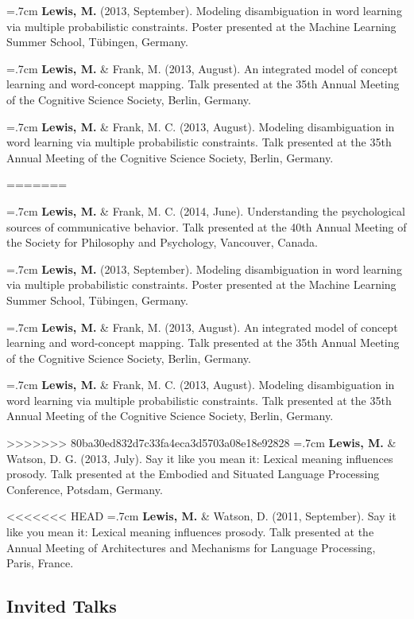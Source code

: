 \documentclass[letterpaper]{article}
\begin{document}
 \hangindent=.7cm {\bf Lewis, M.} (2013, September). Modeling disambiguation in word learning via multiple probabilistic constraints. Poster presented at the Machine Learning Summer School, T\"{u}bingen, Germany.
 

 \hangindent=.7cm {\bf Lewis, M.}  \& Frank, M. (2013, August). An integrated model of concept learning and word-concept mapping. Talk presented at the 35th Annual Meeting of the Cognitive Science Society, Berlin, Germany.
 
 \hangindent=.7cm {\bf Lewis, M.}  \& Frank, M. C.  (2013, August). Modeling disambiguation in word learning via multiple probabilistic constraints. Talk presented at the 35th Annual Meeting of the Cognitive Science Society, Berlin, Germany.
 
=======

\hangindent=.7cm {\bf Lewis, M.} \& Frank, M. C. (2014, June). Understanding the psychological sources of communicative behavior. Talk presented at the 40th Annual Meeting of the Society for Philosophy and Psychology, Vancouver, Canada.

 \hangindent=.7cm {\bf Lewis, M.} (2013, September). Modeling disambiguation in word learning via multiple probabilistic constraints. Poster presented at the Machine Learning Summer School, T\"{u}bingen, Germany.


 \hangindent=.7cm {\bf Lewis, M.}  \& Frank, M. (2013, August). An integrated model of concept learning and word-concept mapping. Talk presented at the 35th Annual Meeting of the Cognitive Science Society, Berlin, Germany.

 \hangindent=.7cm {\bf Lewis, M.}  \& Frank, M. C.  (2013, August). Modeling disambiguation in word learning via multiple probabilistic constraints. Talk presented at the 35th Annual Meeting of the Cognitive Science Society, Berlin, Germany.

>>>>>>> 80ba30ed832d7c33fa4eca3d5703a08e18e92828
  \hangindent=.7cm {\bf Lewis, M.} \& Watson, D. G.  (2013, July). Say it like you mean it: Lexical meaning influences prosody. Talk presented at the Embodied and Situated Language Processing Conference, Potsdam, Germany.

<<<<<<< HEAD
 \hangindent=.7cm {\bf Lewis, M.}  \& Watson, D. (2011, September). Say it like you mean it: Lexical meaning influences prosody. Talk presented at the Annual Meeting of Architectures and Mechanisms for Language Processing, Paris, France.
 

\subsection*{Invited Talks}
\end{document}
